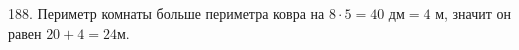 188. Периметр комнаты больше периметра ковра на $8\cdot5=40\text{ дм}=4$ м, значит он равен $20+4=24$м.\\
